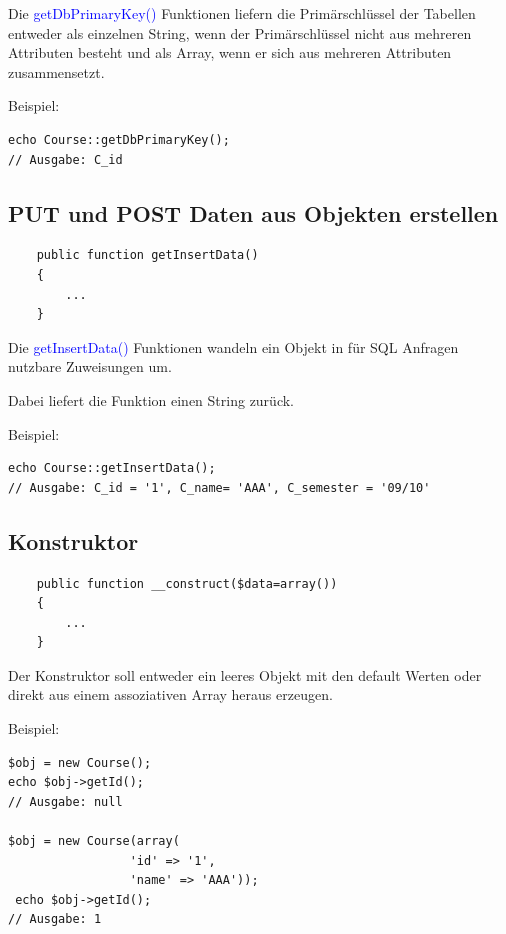 \documentclass[10pt,a4paper,final,parskip]{scrartcl}
\newcommand{\blau}[1]{\textcolor{blue}{#1}}
\begin{document}
Die \blau{getDbPrimaryKey()} Funktionen liefern die Primärschlüssel der Tabellen entweder als einzelnen String, wenn der Primärschlüssel nicht aus mehreren Attributen besteht und als Array, wenn er sich aus mehreren Attributen zusammensetzt.

\begin{minipage}{\textwidth}
Beispiel:
\begin{lstlisting}
echo Course::getDbPrimaryKey();
// Ausgabe: C_id
\end{lstlisting}
\end{minipage}

\subsection{PUT und POST Daten aus Objekten erstellen}
\begin{minipage}{\textwidth}
\begin{lstlisting}
    public function getInsertData()
    {
    	...
    }
\end{lstlisting}
\end{minipage}

Die \blau{getInsertData()} Funktionen wandeln ein Objekt in für SQL Anfragen nutzbare Zuweisungen um.

Dabei liefert die Funktion einen String zurück.

\begin{minipage}{\textwidth}
Beispiel:
\begin{lstlisting}
echo Course::getInsertData();
// Ausgabe: C_id = '1', C_name= 'AAA', C_semester = '09/10'
\end{lstlisting}
\end{minipage}

\subsection{Konstruktor}
\begin{minipage}{\textwidth}
\begin{lstlisting}
    public function __construct($data=array())
    {
    	...
    }
\end{lstlisting}
\end{minipage}

Der Konstruktor soll entweder ein leeres Objekt mit den default Werten oder direkt aus einem assoziativen Array heraus erzeugen.

\begin{minipage}{\textwidth}
Beispiel:
\begin{lstlisting}
$obj = new Course();
echo $obj->getId();
// Ausgabe: null

$obj = new Course(array(
                 'id' => '1',
                 'name' => 'AAA'));
 echo $obj->getId();
// Ausgabe: 1
\end{lstlisting}
\end{minipage}
\end{document}
